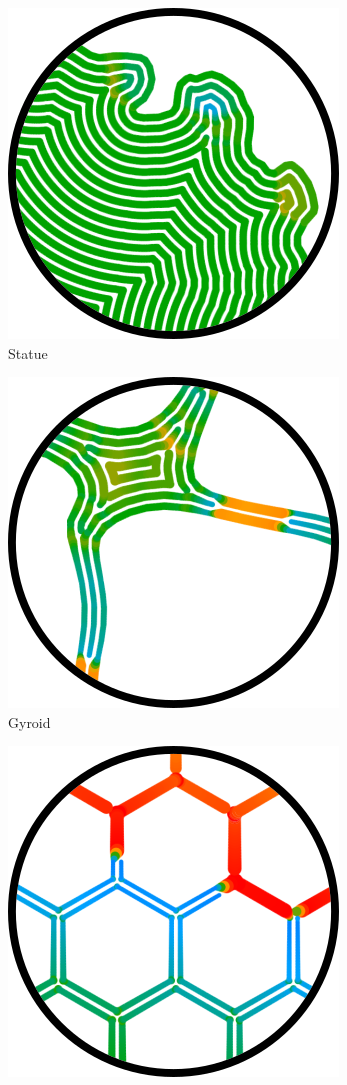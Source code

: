 \begin{figure}
\centering
\setlength{\figwidth}{0.1\textwidth}
\setlength{\figheight}{0.1\textwidth}
\begin{subfigure}{\figwidth}\centering
\includegraphics[height=\figheight]{sources/applications/david.png}
\caption{Statue}%
\end{subfigure}
\begin{subfigure}{\figwidth}\centering
\includegraphics[height=\figheight]{sources/applications/gyroid.png}
\caption{Gyroid}%
\end{subfigure}
\begin{subfigure}{\figwidth}\centering
\includegraphics[height=\figheight]{sources/applications/hex_grid.png}

\end{subfigure}
\end{figure}
